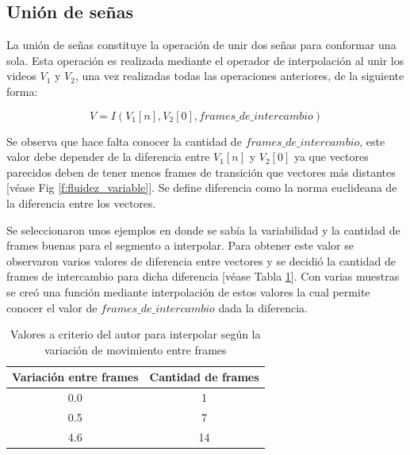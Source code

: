 \subsection{Unión de señas}

La unión de señas constituye la operación de unir dos señas para conformar una sola. Esta operación
es realizada mediante el operador de interpolación al unir los videos $V_1$ y $V_2$, una vez realizadas todas 
las operaciones anteriores, de la siguiente forma:

\begin{equation}
V = I(V_1[n], V_2[0], frames\_de\_intercambio)
\end{equation}

Se observa que hace falta conocer la cantidad de $frames\_de\_intercambio$, este valor debe depender de la diferencia
entre $V_1[n]$ y $V_2[0]$ ya que vectores parecidos deben de tener menos frames de transición que vectores más distantes [véase Fig \ref{f:fluidez_variable}].
Se define diferencia como la norma euclideana de la diferencia entre los vectores.

Se seleccionaron unos ejemplos en donde se sabía la variabilidad y la cantidad de frames buenas para el segmento a interpolar. Para obtener este valor se observaron varios valores de diferencia entre vectores y se decidió la cantidad de frames de 
intercambio para dicha diferencia [véase Tabla \ref{table:intercambio_frame}]. Con varias muestras se creó una función mediante interpolación de estos valores la cual 
permite conocer el valor de $frames\_de\_intercambio$ dada la diferencia.


\begin{table}[h!]
	\begin{center}
	  \caption{Valores a criterio del autor para interpolar según la variación de movimiento entre frames }
	  \label{table:intercambio_frame}
	  \begin{tabular}{c|c} 
		\textbf{Variación entre frames} & \textbf{Cantidad de frames}\\
		\hline
		0.0 & 1 \\
		0.5 & 7 \\
		4.6 & 14\\
	  \end{tabular}
	\end{center}
  \end{table}

